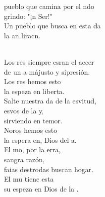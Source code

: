\documentclass[12pt]{article}
\begin{document}
\begin{multicols*}{2}
\begin{cancion}%
	\begin{chorus}%
	pueblo que camina por el ndo\\
	grindo: "¡n Ser!" \\
	Un pueblo que busca en esta da\\
	la an liracn.\\
	\end{chorus}%
	\jump\\
	Los res siempre esran el aecer\\
	de un a májusto y sipresión.\\
	Los res hemos esto \\
	la espeza en  liberta.\\
	Salte nuestra da de la esvitud,\\
	esvos de la y, \\
	sirviendo en temor.\\
	Noros hemos esto \\
	la espera en, Dios del a.\\
	El mo, por la erra, \\
	sangra  razón,\\
	faias destrodas buscan hogar.\\
	El mu tiene esta \\
	su espeza en  Dios de la .\\
\end{cancion}%


\end{multicols*}
\end{document}
